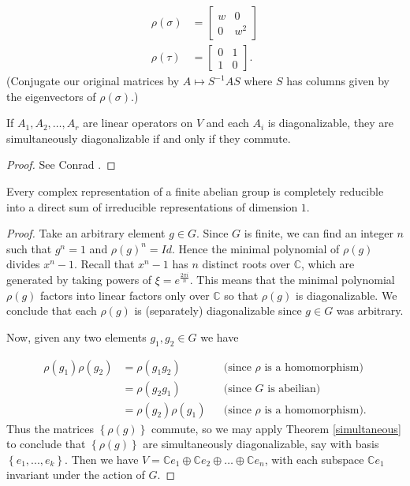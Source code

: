 \begin{example}
\begin{align*}
\rho(\sigma) &= \begin{bmatrix}w & 0 \\ 0 &w^{2}  \end{bmatrix} \\
\rho(\tau) &= \begin{bmatrix} 0 & 1 \\ 1 & 0 \end{bmatrix}.
\end{align*} 
(Conjugate our original matrices by $A \mapsto S^{-1}AS$ where $S$ has columns given by the eigenvectors of $\rho(\sigma)$.)
\end{example}

\begin{thm}\label{simultaneous} If $A_1, A_2, \ldots, A_r$ are linear operators on $V$ and each $A_i$ is diagonalizable, they are simultaneously diagonalizable if and only if they commute.
\end{thm}
\begin{proof}
 See Conrad \cite[Theorem 5.1] {ConradMinPoly}.
\end{proof}

\begin{thm} Every complex representation of a finite abelian group is completely reducible into a direct sum of irreducible representations of dimension $1$.  
\end {thm}
\begin{proof}
Take an arbitrary element $g \in G$.  Since $G$ is finite, we can find an integer $n$ such that $g^n = 1$ and $\rho(g)^n = Id$.    Hence the minimal polynomial of $\rho(g)$ divides  $x^n -1$.  Recall that $x^n-1$ has $n$ distinct roots over $\mathbb{C}$, which are generated by taking powers of $\xi = e^{\frac{2 \pi i}{n}}$.  This means that the minimal polynomial $\rho(g)$ factors into linear factors only over $\mathbb{C}$ so that $\rho(g)$ is diagonalizable.  We conclude that each $\rho(g)$ is (separately) diagonalizable since $g \in G$ was arbitrary.

Now, given any two elements $g_1, g_2 \in G$ we have 

\begin{align*}
\rho(g_1) \rho(g_2)&= \rho(g_1 g_2)&& \text{(since $\rho$ is a homomorphism)} \\
		&=  \rho(g_2 g_1) && \text{(since $G$ is abeilian)} \\
		&= \rho(g_2) \rho(g_1) && \text{(since $\rho$ is a homomorphism)}.
\end{align*}
Thus the matrices $\left\{ \rho(g)\right\}$ commute, so we may apply Theorem \ref{simultaneous} to conclude that $\left\{ \rho(g)\right\}$ are simultaneously diagonalizable, say with basis $\left\{ e_1, ..., e_k \right\}$.  Then we have $V= \mathbb{C}e_1 \oplus \mathbb{C} e_2 \oplus \ldots \oplus \mathbb{C} e_n$, with each subspace $ \mathbb{C}e_1$ invariant under the action of $G$.
\end{proof}

